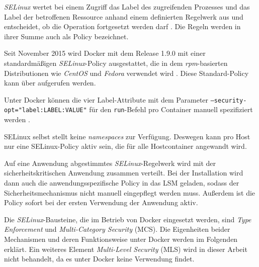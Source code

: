 \documentclass[../main.tex]{subfiles}
\begin{document}
				\emph{SELinux} wertet bei einem Zugriff das Label des zugreifenden Prozesses und das Label der betroffenen Ressource anhand einem definierten Regelwerk aus und entscheidet, ob die Operation fortgesetzt werden darf \cite{linuxSecOverview}. Die Regeln werden in ihrer Summe auch als Policy bezeichnet.

				Seit November 2015 wird Docker mit dem Release 1.9.0 mit einer standardmäßigen \emph{SELinux}-Policy ausgestattet, die in dem \emph{rpm}-basierten Distributionen wie \emph{CentOS} und \emph{Fedora} verwendet wird \cite{githubDockerChangelog}\cite{githubSELinuxPolicyIssue}. Diese Standard-Policy kann über \cite{githubSELinuxProfile} aufgerufen werden.

				Unter Docker können die vier Label-Attribute mit dem Parameter \texttt{--security-opt="label:LABEL:VALUE"} für den \texttt{run}-Befehl pro Container manuell spezifiziert werden \cite{dockerRun}.


				SELinux selbst stellt keine \emph{namespaces} zur Verfügung. Deswegen kann pro Host nur eine SELinux-Policy aktiv sein, die für alle Hostcontainer angewandt wird.

				Auf eine Anwendung abgestimmtes \emph{SELinux}-Regelwerk wird mit der sicherheitskritischen Anwendung zusammen verteilt. Bei der Installation wird dann auch die anwendungsspezifische Policy in das LSM geladen, sodass der Sicherheitsmechanismus nicht manuell eingepflegt werden muss. Außerdem ist die Policy sofort bei der ersten Verwendung der Anwendung aktiv.

				Die \emph{SELinux}-Bausteine, die im Betrieb von Docker eingesetzt werden, sind \emph{Type Enforcement} und \emph{Multi-Category Security} (MCS). Die Eigenheiten beider Mechanismen und deren Funktionsweise unter Docker werden im Folgenden erklärt. Ein weiteres Element \emph{Multi-Level Security} (MLS) wird in dieser Arbeit nicht behandelt, da es unter Docker keine Verwendung findet.


\end{document}
